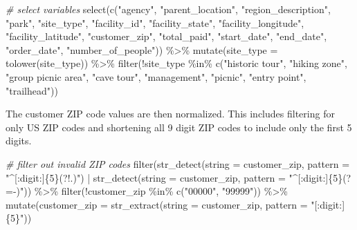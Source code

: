 \documentclass[
]{book}
\newenvironment{Shaded}{\begin{snugshade}}{\end{snugshade}}
\newcommand{\AttributeTok}[1]{\textcolor[rgb]{0.77,0.63,0.00}{#1}}
\newcommand{\CommentTok}[1]{\textcolor[rgb]{0.56,0.35,0.01}{\textit{#1}}}
\newcommand{\FunctionTok}[1]{\textcolor[rgb]{0.00,0.00,0.00}{#1}}
\newcommand{\NormalTok}[1]{#1}
\newcommand{\SpecialCharTok}[1]{\textcolor[rgb]{0.00,0.00,0.00}{#1}}
\newcommand{\StringTok}[1]{\textcolor[rgb]{0.31,0.60,0.02}{#1}}
\begin{document}
\begin{Shaded}
\begin{Highlighting}[]
\CommentTok{\# select variables}
\FunctionTok{select}\NormalTok{(}\FunctionTok{c}\NormalTok{(}\StringTok{"agency"}\NormalTok{, }\StringTok{"parent\_location"}\NormalTok{, }\StringTok{"region\_description"}\NormalTok{, }
         \StringTok{"park"}\NormalTok{, }\StringTok{"site\_type"}\NormalTok{, }\StringTok{"facility\_id"}\NormalTok{, }\StringTok{"facility\_state"}\NormalTok{, }
         \StringTok{"facility\_longitude"}\NormalTok{, }\StringTok{"facility\_latitude"}\NormalTok{, }
         \StringTok{"customer\_zip"}\NormalTok{, }\StringTok{"total\_paid"}\NormalTok{, }\StringTok{"start\_date"}\NormalTok{,}
         \StringTok{"end\_date"}\NormalTok{, }\StringTok{"order\_date"}\NormalTok{, }\StringTok{"number\_of\_people"}\NormalTok{)) }\SpecialCharTok{\%\textgreater{}\%}
  \FunctionTok{mutate}\NormalTok{(}\AttributeTok{site\_type =} \FunctionTok{tolower}\NormalTok{(site\_type)) }\SpecialCharTok{\%\textgreater{}\%}
  \FunctionTok{filter}\NormalTok{(}\SpecialCharTok{!}\NormalTok{site\_type }\SpecialCharTok{\%in\%} \FunctionTok{c}\NormalTok{(}\StringTok{"historic tour"}\NormalTok{, }\StringTok{"hiking zone"}\NormalTok{, }
                           \StringTok{"group picnic area"}\NormalTok{, }\StringTok{"cave tour"}\NormalTok{,}
                           \StringTok{"management"}\NormalTok{, }\StringTok{"picnic"}\NormalTok{, }
                           \StringTok{"entry point"}\NormalTok{, }\StringTok{"trailhead"}\NormalTok{))}
\end{Highlighting}
\end{Shaded}

The customer ZIP code values are then normalized. This includes filtering for only US ZIP codes and shortening all 9 digit ZIP codes to include only the first 5 digits.

\begin{Shaded}
\begin{Highlighting}[]
\CommentTok{\# filter out invalid ZIP codes}
\FunctionTok{filter}\NormalTok{(}\FunctionTok{str\_detect}\NormalTok{(}\AttributeTok{string =}\NormalTok{ customer\_zip,}
                  \AttributeTok{pattern =} \StringTok{"\^{}[:digit:]\{5\}(?!.)"}\NormalTok{) }\SpecialCharTok{|}
         \FunctionTok{str\_detect}\NormalTok{(}\AttributeTok{string =}\NormalTok{ customer\_zip,}
                    \AttributeTok{pattern =} \StringTok{"\^{}[:digit:]\{5\}(?={-})"}\NormalTok{)) }\SpecialCharTok{\%\textgreater{}\%}
  \FunctionTok{filter}\NormalTok{(}\SpecialCharTok{!}\NormalTok{customer\_zip }\SpecialCharTok{\%in\%} \FunctionTok{c}\NormalTok{(}\StringTok{"00000"}\NormalTok{, }\StringTok{"99999"}\NormalTok{)) }\SpecialCharTok{\%\textgreater{}\%}
  \FunctionTok{mutate}\NormalTok{(}\AttributeTok{customer\_zip =} \FunctionTok{str\_extract}\NormalTok{(}\AttributeTok{string =}\NormalTok{ customer\_zip,}
                                    \AttributeTok{pattern =} \StringTok{"[:digit:]\{5\}"}\NormalTok{))}
\end{Highlighting}
\end{Shaded}
\end{document}
